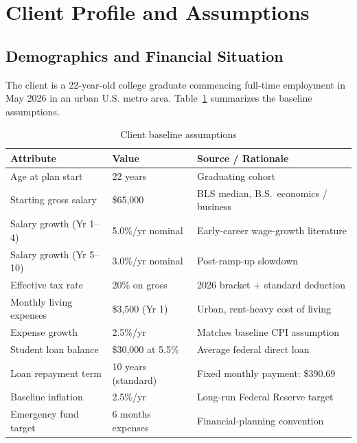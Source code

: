 \documentclass[12pt, letterpaper]{article}
\begin{document}
\section{Client Profile and Assumptions}
\label{sec:client}

\subsection{Demographics and Financial Situation}

The client is a 22-year-old college graduate commencing full-time employment
in May 2026 in an urban U.S. metro area.  Table~\ref{tab:client} summarizes
the baseline assumptions.

\begin{table}[H]
  \centering
  \caption{Client baseline assumptions}
  \label{tab:client}
  \begin{tabularx}{\linewidth}{lXl}
    \toprule
    \textbf{Attribute} & \textbf{Value} & \textbf{Source / Rationale} \\
    \midrule
    Age at plan start      & 22 years & Graduating cohort \\
    Starting gross salary  & \$65{,}000 & BLS median, B.S.\ economics / business \\
    Salary growth (Yr 1--4) & 5.0\%/yr nominal & Early-career wage-growth literature \\
    Salary growth (Yr 5--10) & 3.0\%/yr nominal & Post-ramp-up slowdown \\
    Effective tax rate     & 20\% on gross & 2026 bracket + standard deduction \\
    Monthly living expenses & \$3{,}500 (Yr 1) & Urban, rent-heavy cost of living \\
    Expense growth         & 2.5\%/yr & Matches baseline CPI assumption \\
    Student loan balance   & \$30{,}000 at 5.5\% & Average federal direct loan \\
    Loan repayment term    & 10 years (standard) & Fixed monthly payment: \$390.69 \\
    Baseline inflation     & 2.5\%/yr & Long-run Federal Reserve target \\
    Emergency fund target  & 6 months expenses & Financial-planning convention \\
    \bottomrule
  \end{tabularx}
\end{table}
\end{document}
